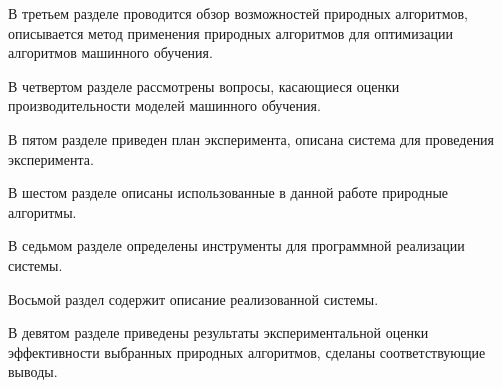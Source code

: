 В третьем разделе проводится обзор возможностей природных алгоритмов, описывается
метод применения природных алгоритмов для оптимизации алгоритмов машинного обучения.

В четвертом разделе рассмотрены вопросы, касающиеся оценки производительности
моделей машинного обучения.

В пятом разделе приведен план эксперимента, описана система для проведения эксперимента.

В шестом разделе описаны использованные в данной работе природные алгоритмы.

В седьмом разделе определены инструменты для программной реализации системы.

Восьмой раздел содержит описание реализованной системы.

В девятом разделе приведены результаты экспериментальной оценки эффективности 
выбранных природных алгоритмов, сделаны соответствующие выводы.

